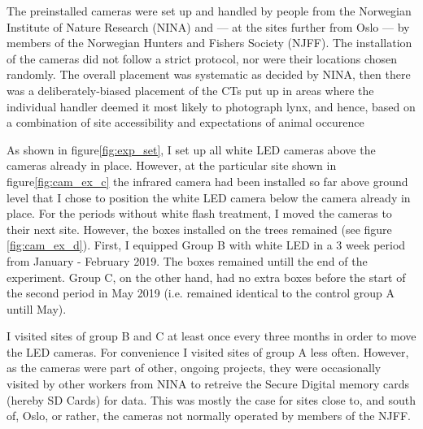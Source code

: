 The preinstalled cameras were set up and handled by people from the Norwegian Institute of Nature Research (NINA) and --- at the sites further from Oslo  --- by members of the Norwegian Hunters and Fishers Society (NJFF). 
The installation of the cameras did not follow a strict protocol, nor were their locations chosen randomly. The overall placement was systematic as decided by NINA, then there was a deliberately-biased placement of the CTs put up in areas where the individual handler deemed it most likely to photograph lynx, and hence, based on a combination of site accessibility and expectations of animal occurence %


As shown in figure\vref{fig:exp_set}, I set up all white LED cameras above the cameras already in place. 
However, at the particular site shown in figure\vref{fig:cam_ex_c} the infrared camera had been installed so far above ground level that I chose to position the white LED camera below the camera already in place. %
For the periods without white flash treatment, I moved the cameras to their next site. However, the boxes installed on the trees remained (see figure \ref{fig:cam_ex_d}).
First, I equipped Group B with white LED in a 3 week period from January - February 2019. The boxes remained untill the end of the experiment. Group C, on the other hand, had no extra boxes before the start of the second period in May 2019 (i.e. remained identical to the control group A untill May).


I visited sites of group B and C at least once every three months in order to move the LED cameras. For convenience I visited sites of group A less often. %
However, as the cameras were part of other, ongoing projects, they were occasionally visited by other workers from NINA to retreive the Secure Digital memory cards (hereby SD Cards) for data. %
This was mostly the case for sites close to, and south of, Oslo, or rather, the cameras not normally operated by members of the NJFF.



